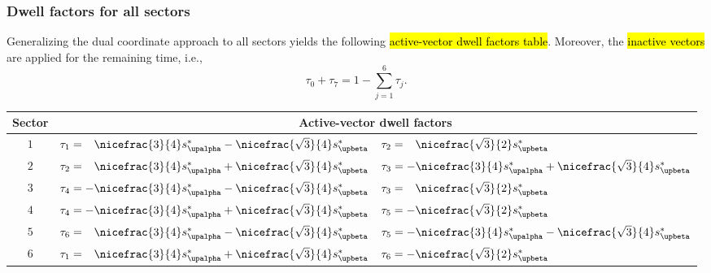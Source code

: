 \begin{frame}
    \frametitle{Dwell factors for all sectors}
    Generalizing the dual coordinate approach to all sectors yields the following \hl{active-vector dwell factors table}. Moreover, the \hl{inactive vectors} are applied for the remaining time, i.e.,
    \begin{equation}
        \tau_0+\tau_7 = 1 - \sum_{j=1}^6 \tau_j.
        \label{eq:zero_vector_dwell_time_SVM}
    \end{equation}
    \begin{table}
        \centering
        \setlength{\tabcolsep}{6pt}
        \renewcommand{\arraystretch}{1.25}
        \begin{tabular}{c c l}
            \toprule
            Sector & \multicolumn{2}{c}{Active-vector dwell factors}                                                                                                                     \\
            \midrule
            $1$    & $\tau_1 = \phantom{-}\nicefrac{3}{4}s_\upalpha^* - \nicefrac{\sqrt{3}}{4}s_\upbeta^*$ & $\tau_2 = \phantom{-}\nicefrac{\sqrt{3}}{2}s_\upbeta^*$                     \\
            $2$    & $\tau_2 = \phantom{-}\nicefrac{3}{4}s_\upalpha^* + \nicefrac{\sqrt{3}}{4}s_\upbeta^*$ & $\tau_3 = -\nicefrac{3}{4}s_\upalpha^* + \nicefrac{\sqrt{3}}{4}s_\upbeta^*$ \\
            $3$    & $\tau_4 = -\nicefrac{3}{4}s_\upalpha^* - \nicefrac{\sqrt{3}}{4}s_\upbeta^*$           & $\tau_3 = \phantom{-}\nicefrac{\sqrt{3}}{2}s_\upbeta^*$                     \\
            $4$    & $\tau_4 = -\nicefrac{3}{4}s_\upalpha^* + \nicefrac{\sqrt{3}}{4}s_\upbeta^*$           & $\tau_5 = -\nicefrac{\sqrt{3}}{2}s_\upbeta^*$                               \\
            $5$    & $\tau_6 = \phantom{-}\nicefrac{3}{4}s_\upalpha^* - \nicefrac{\sqrt{3}}{4}s_\upbeta^*$ & $\tau_5 = -\nicefrac{3}{4}s_\upalpha^* - \nicefrac{\sqrt{3}}{4}s_\upbeta^*$ \\
            $6$    & $\tau_1 = \phantom{-}\nicefrac{3}{4}s_\upalpha^* + \nicefrac{\sqrt{3}}{4}s_\upbeta^*$ & $\tau_6 = -\nicefrac{\sqrt{3}}{2}s_\upbeta^*$                               \\
            \bottomrule
        \end{tabular}
    \end{table}
\end{frame}



